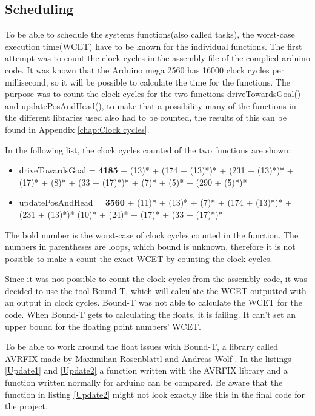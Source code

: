 \subsection{Scheduling}
\label{sec:i3Scheduling}
To be able to schedule the systems functions(also called tasks), the worst-case execution time(WCET) have to be known for the individual functions. The first attempt was to count the clock cycles in the assembly file of the complied arduino code. It was known that the Arduino mega 2560 has 16000 clock cycles per millisecond, so it will be possible to calculate the time for the functions. The purpose was to count the clock cycles for the two functions driveTowardsGoal() and updatePosAndHead(), to make that a possibility many of the functions in the different libraries used also had to be counted, the results of this can be found in Appendix \ref{chap:Clock cycles}.

In the following list, the clock cycles counted of the two functions are shown:
\begin{itemize}
	\item driveTowardsGoal = \textbf{4185} + (13)* + (174 + (13)*)* + (231 + (13)*)* + (17)* + (8)* + (33 + (17)*)* + (7)* + (5)* + (290 + (5)*)*
	\item updatePosAndHead = \textbf{3560} + (11)* + (13)* + (7)* + (174 + (13)*)* + (231 + (13)*)* (10)* + (24)* + (17)* + (33 + (17)*)*
\end{itemize}
The bold number is the worst-case of clock cycles counted in the function. The numbers in parentheses are loops, which bound is unknown, therefore it is not possible to make a count the exact WCET by counting the clock cycles.

Since it was not possible to count the clock cycles from the assembly code, it was decided to use the tool Bound-T, which will calculate the WCET outputted with an output in clock cycles. \newline
Bound-T was not able to calculate the WCET for the code. When Bound-T gets to calculating the floats, it is failing. It can't set an upper bound for the floating point numbers' WCET.

To be able to work around the float issues with Bound-T, a library called AVRFIX made by Maximilian Rosenblattl and Andreas Wolf \citep{AVRFIX}. In the listings \ref{Update1} and \ref{Update2} a function written with the AVRFIX library and a function written normally for arduino can be compared. Be aware that the function in listing \ref{Update2} might not look exactly like this in the final code for the project. 

